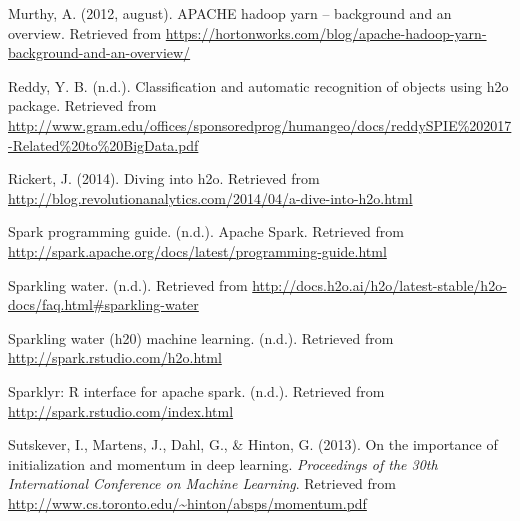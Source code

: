 \documentclass[12pt,twoside]{amherstthesis}
\begin{document}
  \hypertarget{ref-hortonApache}{}
  Murthy, A. (2012, august). APACHE hadoop yarn -- background and an
  overview. Retrieved from
  \url{https://hortonworks.com/blog/apache-hadoop-yarn-background-and-an-overview/}
  
  \hypertarget{ref-DeepFeedForward}{}
  Reddy, Y. B. (n.d.). Classification and automatic recognition of objects
  using h2o package. Retrieved from
  \url{http://www.gram.edu/offices/sponsoredprog/humangeo/docs/reddySPIE\%202017-Related\%20to\%20BigData.pdf}
  
  \hypertarget{ref-JVM}{}
  Rickert, J. (2014). Diving into h2o. Retrieved from
  \url{http://blog.revolutionanalytics.com/2014/04/a-dive-into-h2o.html}
  
  \hypertarget{ref-RDD}{}
  Spark programming guide. (n.d.). Apache Spark. Retrieved from
  \url{http://spark.apache.org/docs/latest/programming-guide.html}
  
  \hypertarget{ref-Sparklingh2oDoc}{}
  Sparkling water. (n.d.). Retrieved from
  \url{http://docs.h2o.ai/h2o/latest-stable/h2o-docs/faq.html\#sparkling-water}
  
  \hypertarget{ref-SparklingWaterML}{}
  Sparkling water (h20) machine learning. (n.d.). Retrieved from
  \url{http://spark.rstudio.com/h2o.html}
  
  \hypertarget{ref-SparklingWaterOverview}{}
  Sparklyr: R interface for apache spark. (n.d.). Retrieved from
  \url{http://spark.rstudio.com/index.html}
  
  \hypertarget{ref-momentum}{}
  Sutskever, I., Martens, J., Dahl, G., \& Hinton, G. (2013). On the
  importance of initialization and momentum in deep learning.
  \emph{Proceedings of the 30th International Conference on Machine
  Learning}. Retrieved from
  \url{http://www.cs.toronto.edu/~hinton/absps/momentum.pdf}


\end{document}
